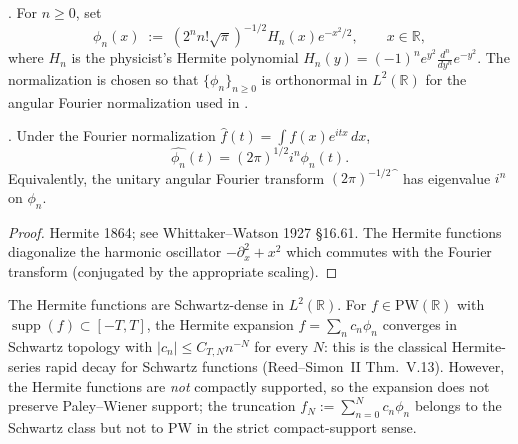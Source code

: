 \begin{definition}
\label{v4-arith:w7-h:def:hermite}
\ClaimStatusDefinitional. For \(n\geq 0\), set
\begin{equation}
\label{v4-arith:w7-h:eq:hermite}
\phi_{n}(x)\;:=\;(2^{n}n!\sqrt{\pi})^{-1/2}H_{n}(x)e^{-x^{2}/2},
\qquad x\in\mathbb{R},
\end{equation}
where \(H_{n}\) is the physicist's Hermite polynomial
\(H_{n}(y)=(-1)^{n}e^{y^{2}}\frac{d^{n}}{dy^{n}}e^{-y^{2}}\).
The normalization is chosen so that \(\{\phi_{n}\}_{n\geq 0}\) is
orthonormal in \(L^{2}(\mathbb{R})\) for the angular Fourier
normalization used in .
\end{definition}

\begin{proposition}
\label{v4-arith:w7-h:prop:hermite-self-reciprocal}
\ClaimStatusProvedElsewhere. Under the Fourier normalization
\(\widehat{f}(t)=\int f(x)e^{itx}\,dx\),
\begin{equation}
\label{v4-arith:w7-h:eq:hermite-fourier-factor}
\widehat{\phi_{n}}(t)=(2\pi)^{1/2}i^{n}\phi_{n}(t).
\end{equation}
Equivalently, the unitary angular Fourier transform
\((2\pi)^{-1/2}\widehat{\phantom f}\) has eigenvalue \(i^{n}\) on
\(\phi_{n}\).
\end{proposition}

\begin{proof}
Hermite 1864; see Whittaker--Watson 1927 \S16.61. The Hermite
functions diagonalize the harmonic oscillator \(-\partial_{x}^{2}+x^{2}\)
which commutes with the Fourier transform (conjugated by the
appropriate scaling).
\end{proof}

\begin{remark}
\label{v4-arith:w7-h:rem:hermite-dense}
The Hermite functions are Schwartz-dense in \(L^{2}(\mathbb{R})\).
For \(f\in\mathrm{PW}(\mathbb{R})\) with
\(\operatorname{supp}(f)\subset[-T,T]\), the Hermite expansion
\(f=\sum_{n}c_{n}\phi_{n}\) converges in Schwartz topology with
\(|c_{n}|\leq C_{T,N}n^{-N}\) for every \(N\): this is the classical
Hermite-series rapid decay for Schwartz functions (Reed--Simon~II
Thm.~V.13). However, the Hermite functions are \emph{not} compactly
supported, so the expansion does not preserve Paley--Wiener support;
the truncation
\(f_{N}:=\sum_{n=0}^{N}c_{n}\phi_{n}\) belongs to the Schwartz class
but not to \(\mathrm{PW}\) in the strict compact-support sense.
\end{remark}

